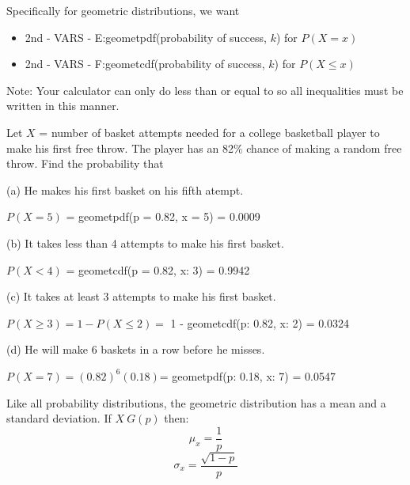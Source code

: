 \documentclass[../stats.tex]{subfiles}
\begin{document}
Specifically for geometric distributions, we want 
\begin{itemize}
    \item 2nd - VARS - E:geometpdf(probability of success, $k$) for $P(X=x)$
    \item 2nd - VARS - F:geometcdf(probability of success, $k$) for $P(X\leq x)$
\end{itemize}

Note: Your calculator can only do less than or equal to so all inequalities must be written in this manner.
\pagebreak 
\begin{example}
    Let $X$ = number of basket attempts needed for a college basketball player to make his first free throw. The player has an 82\% chance of making a random free throw. Find the probability that 

    (a) He makes his first basket on his fifth atempt.

    $P(X=5)$ = geometpdf(p = 0.82, x = 5) = 0.0009

    (b) It takes less than 4 attempts to make his first basket.

    $P(X<4)$ = geometcdf(p = 0.82, x: 3) = 0.9942

    (c) It takes at least 3 attempts to make his first basket.

    $P(X\geq 3) = 1-P(X\leq 2) =$ 1 - geometcdf(p: 0.82, x: 2) = 0.0324

    (d) He will make 6 baskets in a row before he misses.

    $P(X=7)=(0.82)^6(0.18)$= geometpdf(p: 0.18, x: 7) = 0.0547
\end{example}

Like all probability distributions, the geometric distribution has a mean and a standard deviation. If $X~G(p)$ then: 
\[ \mu_x = \frac{1}{p}\]
\[ \sigma_x = \frac{\sqrt{1-p}}{p} \]
\end{document}
